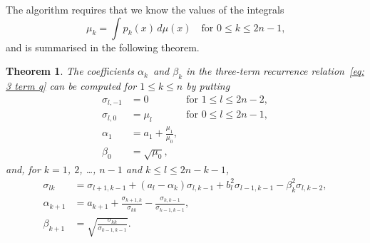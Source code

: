 \documentclass[12pt,a4paper]{article}
\newtheorem{theorem}{Theorem}
\begin{document}
The algorithm requires that we know the values of the integrals
\[
\mu_k=\int p_k(x)\,d\mu(x)\quad\text{for $0\le k\le 2n-1$,}
\]
and is summarised in the following theorem.

\begin{theorem}
The coefficients $\alpha_k$~and $\beta_k$ in the three-term 
recurrence relation~\eqref{eq: 3 term q} can be computed 
for $1\le k\le n$ by putting
\[
\begin{aligned}
\sigma_{l,-1}&=0&\text{for $1\le l\le 2n-2$},\\
\sigma_{l,0}&=\mu_l&\text{for $0\le l\le2n-1$},\\
\alpha_1&=a_1+\frac{\mu_1}{\mu_0},\\
\beta_0&=\sqrt{\mu_0},
\end{aligned} 
\]
and, for $k=1$, $2$, \dots, $n-1$ and $k\le l\le2n-k-1$, 
\[
\begin{aligned}
\sigma_{lk}&=\sigma_{l+1,k-1}+(a_l-\alpha_k)\sigma_{l,k-1}
		+b_l^2\sigma_{l-1,k-1}-\beta_k^2\sigma_{l,k-2},\\
\alpha_{k+1}&=a_{k+1}+\frac{\sigma_{k+1,k}}{\sigma_{kk}}
	-\frac{\sigma_{k,k-1}}{\sigma_{k-1,k-1}},\\
\beta_{k+1}&=\sqrt{\frac{\sigma_{kk}}{\sigma_{k-1,k-1}}}.
\end{aligned}
\]
\end{theorem}
\end{document}
